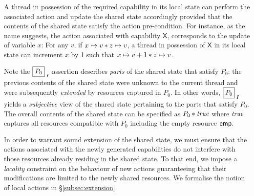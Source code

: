 A thread in possession of the required capability in its local state can perform the associated action and update the shared state accordingly provided that the contents of the shared state satisfy the action pre-condition.
For instance, as the name suggests, the action associated with capability $\textsf{X}$, corresponds to the update of variable $x$: For any $v$, if $x \mapsto v * z \mapsto v$, a thread in possession of $\textsf{X}$ in its local state can increment $x$ by 1 such that $x \mapsto v+1 * z \mapsto v$. 

Note the $\shared{P_0}{I}$ assertion describes \emph{parts} of the shared state that satisfy $P_0$: the previous contents of the shared state were unknown to the current thread and were subsequently \emph{extended} by resources captured in $P_0$. In other words, $\shared{P_0}{I}$ yields a \emph{subjective} view of the shared state pertaining to the parts that satisfy $P_0$. The overall contents of the shared state can be specified as $P_0 * \mathit{true}$ where $\mathit{true}$ captures all resources compatible with $P_0$ including the empty resource $\mathsf{emp}$.

In order to warrant sound extension of the shared state, we must ensure that the actions associated with the newly generated capabilities do not interfere with those resources already residing in the shared state. To that end, we impose a \emph{locality} constraint on the behaviour of new actions guaranteeing that their modifications are limited to the newly shared resources. We formalise the notion of local actions in \S\ref{subsec:extension}.
 
